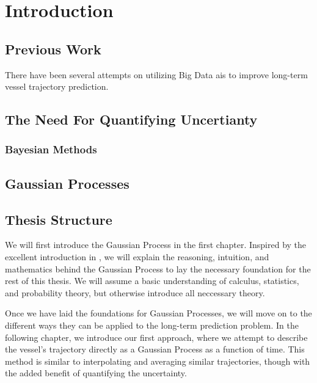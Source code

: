 \chapter{Introduction}
\section{Previous Work}
There have been several attempts on utilizing Big Data \acrshort{ais} to improve long-term vessel trajectory prediction. 



\section{The Need For Quantifying Uncertianty}

\subsection{Bayesian Methods}
\section{Gaussian Processes}

\section{Thesis Structure}
We will first introduce the Gaussian Process in the first chapter. Inspired by the excellent introduction in \cite{rasmussen}, we will explain the reasoning, intuition, and mathematics behind the Gaussian Process to lay the necessary foundation for the rest of this thesis. We will assume a basic understanding of calculus, statistics, and probability theory, but otherwise introduce all neccessary theory.  

Once we have laid the foundations for Gaussian Processes, we will move on to the different ways they can be applied to the long-term prediction problem. In the following chapter, we introduce our first approach, where we attempt to describe the vessel's trajectory directly as a Gaussian Process as a function of time. This method is similar to interpolating and averaging similar trajectories, though with the added benefit of quantifying the uncertainty.

